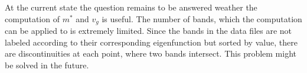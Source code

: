 At the current state the question remains to be answered weather the computation of $m^{*}$ and $v_g$ is useful. The number of bands, which the computation can be applied to is extremely limited. Since the bands in the data files are not labeled according to their corresponding eigenfunction but sorted by value, there are discontinuities at each point, where two bands intersect. This problem might be solved in the future. 













%
%    


 
